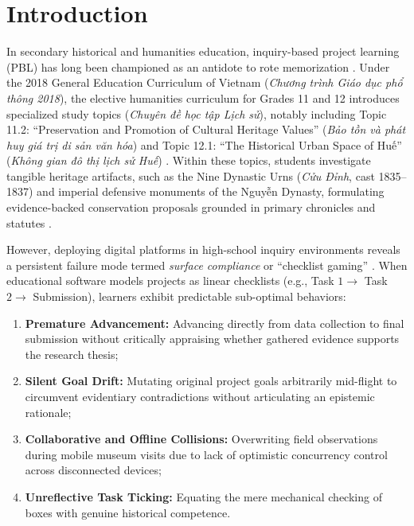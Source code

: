 \documentclass[11pt,a4paper]{article}
\begin{document}
\section{Introduction}

In secondary historical and humanities education, inquiry-based project learning (PBL) has long been championed as an antidote to rote memorization \cite{zimmerman2000attaining, pintrich2004conceptual}. Under the 2018 General Education Curriculum of Vietnam (\textit{Chương trình Giáo dục phổ thông 2018}), the elective humanities curriculum for Grades 11 and 12 introduces specialized study topics (\textit{Chuyên đề học tập Lịch sử}), notably including Topic 11.2: ``Preservation and Promotion of Cultural Heritage Values'' (\textit{Bảo tồn và phát huy giá trị di sản văn hóa}) and Topic 12.1: ``The Historical Urban Space of Huế'' (\textit{Không gian đô thị lịch sử Huế}) \cite{moet2018curriculum}. Within these topics, students investigate tangible heritage artifacts, such as the Nine Dynastic Urns (\textit{Cửu Đỉnh}, cast 1835--1837) and imperial defensive monuments of the Nguyễn Dynasty, formulating evidence-backed conservation proposals grounded in primary chronicles and statutes \cite{phan1837dainam, khamdinh1851hoidien}.

However, deploying digital platforms in high-school inquiry environments reveals a persistent failure mode termed \textit{surface compliance} or ``checklist gaming'' \cite{baker2008gaming, azevedo2005scaffolding}. When educational software models projects as linear checklists (e.g., Task $1 \to$ Task $2 \to$ Submission), learners exhibit predictable sub-optimal behaviors:
\begin{enumerate}[label=(\alph*)]
    \item \textbf{Premature Advancement:} Advancing directly from data collection to final submission without critically appraising whether gathered evidence supports the research thesis;
    \item \textbf{Silent Goal Drift:} Mutating original project goals arbitrarily mid-flight to circumvent evidentiary contradictions without articulating an epistemic rationale;
    \item \textbf{Collaborative and Offline Collisions:} Overwriting field observations during mobile museum visits due to lack of optimistic concurrency control across disconnected devices;
    \item \textbf{Unreflective Task Ticking:} Equating the mere mechanical checking of boxes with genuine historical competence.
\end{enumerate}
\end{document}
